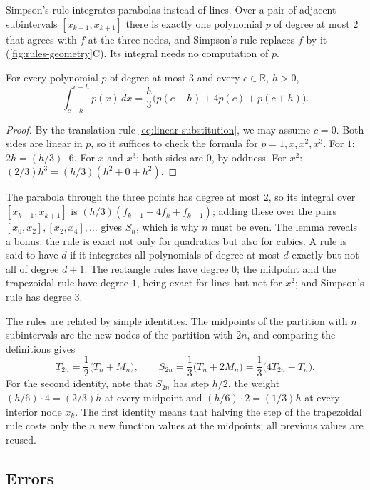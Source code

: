 Simpson's rule integrates parabolas instead of lines. Over a pair of adjacent subintervals $[x_{k-1},x_{k+1}]$ there is exactly one polynomial $p$ of degree at most $2$ that agrees with $f$ at the three nodes, and Simpson's rule replaces $f$ by it (\cref{fig:rules-geometry}C). Its integral needs no computation of $p$.

\begin{lemma}
\label{lem:simpson-exact}
For every polynomial $p$ of degree at most $3$ and every $c\in\mathbb R$, $h>0$,
\[
\int_{c-h}^{c+h}p(x)\,dx=\frac h3\bigl(p(c-h)+4p(c)+p(c+h)\bigr).
\]
\end{lemma}

\begin{proof}
By the translation rule \eqref{eq:linear-substitution}, we may assume $c=0$. Both sides are linear in $p$, so it suffices to check the formula for $p=1,x,x^2,x^3$. For $1$: $2h=(h/3)\cdot6$. For $x$ and $x^3$: both sides are $0$, by oddness. For $x^2$: $(2/3)h^3=(h/3)(h^2+0+h^2)$.
\end{proof}

The parabola through the three points has degree at most $2$, so its integral over $[x_{k-1},x_{k+1}]$ is $(h/3)(f_{k-1}+4f_k+f_{k+1})$; adding these over the pairs $[x_0,x_2],[x_2,x_4],\ldots$ gives $S_n$, which is why $n$ must be even. The lemma reveals a bonus: the rule is exact not only for quadratics but also for cubics. A rule is said to have  $d$ if it integrates all polynomials of degree at most $d$ exactly but not all of degree $d+1$. The rectangle rules have degree $0$; the midpoint and the trapezoidal rule have degree $1$, being exact for lines but not for $x^2$; and Simpson's rule has degree $3$.

The rules are related by simple identities. The midpoints of the partition with $n$ subintervals are the new nodes of the partition with $2n$, and comparing the definitions gives
\begin{equation}
T_{2n}=\frac12\bigl(T_n+M_n\bigr),\qquad S_{2n}=\frac13\bigl(T_n+2M_n\bigr)=\frac13\bigl(4T_{2n}-T_n\bigr).
\label{eq:rule-relations}
\end{equation}
For the second identity, note that $S_{2n}$ has step $h/2$, the weight $(h/6)\cdot4=(2/3)h$ at every midpoint and $(h/6)\cdot2=(1/3)h$ at every interior node $x_k$. The first identity means that halving the step of the trapezoidal rule costs only the $n$ new function values at the midpoints; all previous values are reused.

\subsection{Errors}

